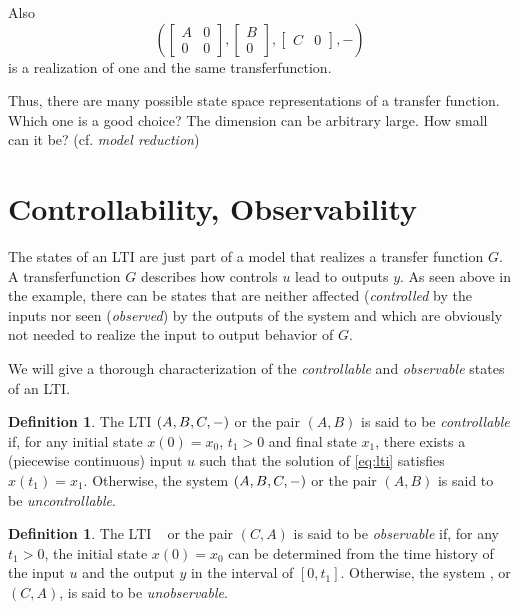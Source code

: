 \documentclass[a4paper,10pt]{article}
\theoremstyle{definition}
\newtheorem{definition}[theorem]{Definition}
\begin{document}
Also
\begin{equation*}
	(
	\begin{bmatrix} A & 0 \\ 0 & 0 \end{bmatrix},
	\begin{bmatrix} B \\ 0 \end{bmatrix},
	\begin{bmatrix} C & 0 \end{bmatrix}, -
	)
\end{equation*}
is a realization of one and the same transferfunction.

Thus, there are many possible state space representations of a transfer function. Which one is a good choice? The dimension can be arbitrary large. How small can it be? (cf. \emph{model reduction})

\section{Controllability, Observability}

The states of an LTI are just part of a model that realizes a transfer function $G$. A transferfunction $G$ describes how controls $u$ lead to outputs $y$. As seen above in the example, there can be states that are neither affected (\emph{controlled} by the inputs nor seen (\emph{observed}) by the outputs of the system and which are obviously not needed to realize the input to output behavior of $G$.  

We will give a thorough characterization of the \emph{controllable} and \emph{observable} states of an LTI. 

\begin{definition}
	The LTI $(A,B,C,-)$ or the pair $(A, B)$ is said to be \emph{controllable} if, for any initial state $x(0) = x_0$, $t_1 > 0$ and final state $x_1$, there exists a (piecewise continuous) input $u$ such that the solution of \eqref{eq:lti} satisfies $x(t_1 ) = x_1$. Otherwise, the system $(A,B,C,-)$ or the pair $(A, B)$ is said to be \emph{uncontrollable}.
\end{definition}


\begin{definition}
	The LTI \abcsys~ or the pair $(C,A)$ is said to be \emph{observable} if, for any $t_1 > 0$, the initial state $x(0) = x_0$ can be determined from the time history of the input $u$ and the output $y$ in the interval of $[0, t_1]$. Otherwise, the system \abcsys, or $(C, A)$, is said to be \emph{unobservable}.
\end{definition}
\end{document}

